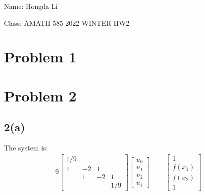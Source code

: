 \documentclass[]{article}
\begin{document}
Name: Hongda Li
\par
Class: AMATH 585 2022 WINTER HW2
\section*{Problem 1}
    
\section*{Problem 2}
    \subsection*{2(a)}
        The system is: 
        \begin{align*}\tag{2.a.1}\label{eqn:2.a.1}
            9 \begin{bmatrix}
                1/9 & & & \\
                1 & - 2 & 1 & \\
                & 1 & -2 & 1 \\ 
                & & & 1/9
            \end{bmatrix}
            \begin{bmatrix}
                u_0 \\ u_1 \\ u_2 \\ u_4
            \end{bmatrix}
            &= 
            \begin{bmatrix}
                1 \\ f(x_1) \\ f(x_2) \\ 1
            \end{bmatrix}
        \end{align*}
\end{document}
